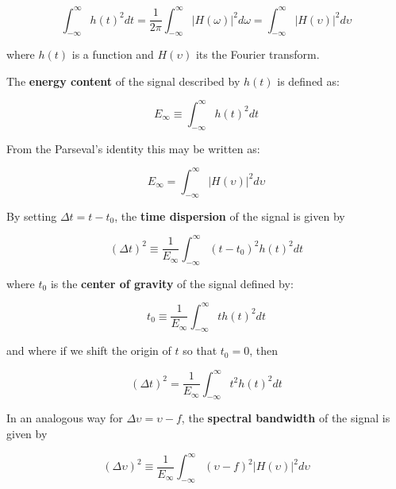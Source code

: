 \begin{equation}\label{eq:parseval_theorem}
	\int_{-\infty}^{\infty} h(t)^2 dt =  \frac{1}{2 \pi} \int_{-\infty}^{\infty} |H(\omega)|^2 d\omega =  \int_{-\infty}^{\infty} |H(\upsilon)|^2 d\upsilon
\end{equation}

where $h(t)$ is a function and $H(\upsilon)$ its the Fourier transform. 

The \textbf{energy content} of the signal described by $h(t)$ is defined as:

\begin{equation}\label{eq:energy_content_time}
    E_{\infty} \equiv \int_{-\infty}^{\infty}  h(t)^2 dt
\end{equation}


From the Parseval's identity this may be written as:

\begin{equation}\label{eq:energy_content_frequency}
    E_{\infty} =  \int_{-\infty}^{\infty} |H(\upsilon)|^2 d\upsilon
\end{equation}

By setting $\Delta t = t - t_0$, the \textbf{time dispersion} of the signal is given by

\begin{equation}\label{eq:time_dispersion_no_centered}
    (\Delta t)^2 \equiv \frac{1}{E_{\infty}} \int_{-\infty}^{\infty} (t-t_{0})^2 h(t)^2 dt
\end{equation}

where $t_0$ is the \textbf{center of gravity} of the signal defined by:

\begin{equation}\label{eq:center_of_gravity}
    t_0 \equiv \frac{1}{E_{\infty}} \int_{-\infty}^{\infty} t h(t)^2 dt
\end{equation}

and where if we shift the origin of $t$ so that $t_{0}=0$, then

\begin{equation}\label{eq:time_dispersion}
    (\Delta t)^2 = \frac{1}{E_{\infty}} \int_{-\infty}^{\infty} t^2 h(t)^2 dt
\end{equation}

In an analogous way for $\Delta \upsilon = \upsilon - f$, the \textbf{spectral bandwidth} of the signal is given by

\begin{equation}\label{eq:spectral_bandwidth_no_centered}
    (\Delta \upsilon)^2 \equiv \frac{1}{E_{\infty}} \int_{-\infty}^{\infty} (\upsilon-f)^2 |H(\upsilon)|^2 d\upsilon
\end{equation}

